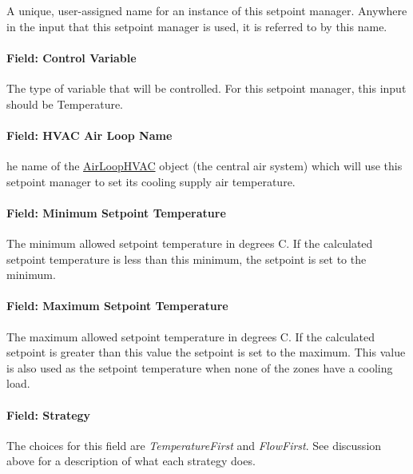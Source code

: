 A unique, user-assigned name for an instance of this setpoint manager. Anywhere in the input that this setpoint manager is used, it is referred to by this name.

\paragraph{Field: Control Variable}\label{field-control-variable-13}

The type of variable that will be controlled. For this setpoint manager, this input should be Temperature.

\paragraph{Field: HVAC Air Loop Name}\label{field-hvac-air-loop-name-3}

he name of the \hyperref[airloophvac]{AirLoopHVAC} object (the central air system) which will use this setpoint manager to set its cooling supply air temperature.

\paragraph{Field: Minimum Setpoint Temperature}\label{field-minimum-setpoint-temperature-3}

The minimum allowed setpoint temperature in degrees C. If the calculated setpoint temperature is less than this minimum, the setpoint is set to the minimum.

\paragraph{Field: Maximum Setpoint Temperature}\label{field-maximum-setpoint-temperature-3}

The maximum allowed setpoint temperature in degrees C. If the calculated setpoint is greater than this value the setpoint is set to the maximum. This value is also used as the setpoint temperature when none of the zones have a cooling load.

\paragraph{Field: Strategy}\label{field-strategy-2}

The choices for this field are \emph{TemperatureFirst} and \emph{FlowFirst}. See discussion above for a description of what each strategy does.

